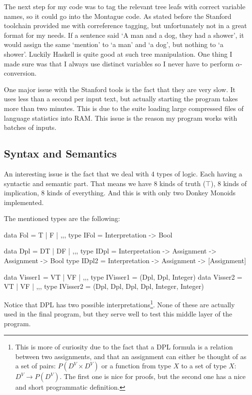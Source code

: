 \documentclass[12pt]{article}
\begin{document}
The next step for my code was to tag the relevant tree leafs with correct variable names, so it could go into the Montague code. As stated before the Stanford toolchain provided me with correference tagging, but unfortunately not in a great format for my needs. If a sentence said `A man and a dog, they had a shower', it would assign the same `mention' to `a man' and `a dog', but nothing to `a shower'. Luckily Haskell is quite good at such tree manipulation. One thing I made sure was that I always use distinct variables so I never have to perform $\alpha$-conversion.

One major issue with the Stanford tools is the fact that they are very slow. It uses less than a second per input text, but actually starting the program takes more than two minutes. This is due to the suite loading large compressed files of language statistics into RAM. This issue is the reason my program works with batches of inputs.

\subsection{Syntax and Semantics}

An interesting issue is the fact that we deal with 4 types of logic. Each having a syntactic and semantic part. That means we have 8 kinds of truth ($\top$), 8 kinds of implication, 8 kinds of everything. And this is with only two Donkey Monoids implemented.

The mentioned types are the following:

\begin{haskell}
data Fol = T | F | ,,,
type IFol = Interpretation -> Bool

data Dpl = DT | DF | ,,,
type IDpl = Interpretation -> Assignment -> Assignment -> Bool
type IDpl2 = Interpretation -> Assignment -> [Assignment]

data Visser1 = VT | VF | ,,,
type IVisser1 = (Dpl, Dpl, Integer)
data Visser2 = VT | VF | ,,,
type IVisser2 = (Dpl, Dpl, Dpl, Dpl, Integer, Integer)
\end{haskell}

Notice that DPL has two possible interpretations\footnote{This is more of curiosity due to the fact that a DPL formula is a relation between two assignments, and that an assignment can either be thought of as a set of pairs: $P(D^V \times D^V)$ or a function from type $X$ to a set of type $X$: $D^V \rightarrow P(D^V)$. The first one is nice for proofs, but the second one has a nice and short programmatic definition.}. None of these are actually used in the final program, but they serve well to test this middle layer of the program.
\end{document}
